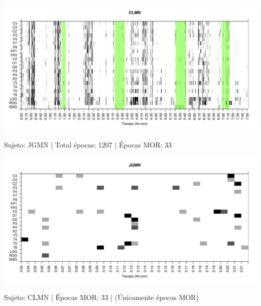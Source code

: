 \begin{SidewaysFigure}
\centering
\includegraphics[width=\linewidth]
{./material_bonito170220/CLMN10SUE_132_mor132_tot944_est_total.pdf} 
\caption{Sujeto: JGMN | Total \'epocas: 1207 | \'Epocas MOR: 33}
\end{SidewaysFigure}
\begin{SidewaysFigure}
\centering
\includegraphics[width=\linewidth]
{./material_bonito170220/JGMN6SUE_33_mor33_tot33_est_mor.pdf} 
\caption{Sujeto: CLMN | \'Epocas MOR: 33 | (\'Unicamente \'epocas MOR)}
\end{SidewaysFigure}


